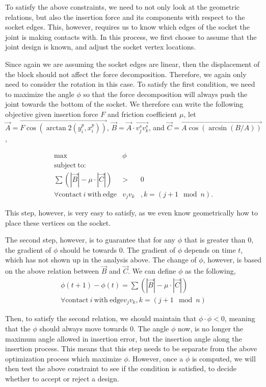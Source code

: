 To satisfy the above constraints, we need to not only look at the geometric relations, but also the insertion force and its components with respect to the socket edges. This, however, requires us to know which edges of the socket the joint is making contacts with. In this process, we first choose to assume that the joint design is known, and adjust the socket vertex locations. 

Since again we are assuming the socket edges are linear, then the displacement of the block should not affect the force decomposition. Therefore, we again only need to consider the rotation in this case. To satisfy the first condition, we need to maximize the angle $\phi$ so that the force decomposition will always push the joint towards the bottom of the socket. We therefore can write the following objective given insertion force $F$ and friction coefficient $\mu$, let $\overrightarrow{A} = \overrightarrow{F\cos(\arctan2(y^p_i, x^p_i))}$, $\overrightarrow{B} = \overrightarrow{A}\cdot\overrightarrow{v^s_jv^s_k}$, and $\overrightarrow{C} = \overrightarrow{A\cos(\arcsin(B/A))}$, 

\begin{eqnarray}
\max &\phi&\\
\mathrm{subject\ to: }&&\nonumber\\
\sum(|\overrightarrow{B}| - \mu\cdot |\overrightarrow{C}|) &>& 0\\
\forall\mathrm{contact\ } i\mathrm{\ with\ edge}& v_jv_k&, k=(j+1\mod n).\nonumber 
\end{eqnarray}

This step, however, is very easy to satisfy, as we even know geometrically how to place these vertices on the socket. 

The second step, however, is to guarantee that for any $\phi$ that is greater than $0$, the gradient of $\phi$ should be towards $0$. The gradient of $\phi$ depends on time $t$, which has not shown up in the analysis above. The change of $\phi$, however, is based on the above relation between $\overrightarrow{B}$ and $\overrightarrow{C}$. We can define $\phi$ as the following, 
\begin{eqnarray}
\phi(t+1) - \phi(t) = \sum(|\overrightarrow{B}| - \mu\cdot |\overrightarrow{C}|)\\
\forall\mathrm{contact\ } i\mathrm{\ with\ edge} v_jv_k, k=(j+1\mod n)\nonumber
\end{eqnarray}

Then, to satisfy the second relation, we should maintain that $\phi\cdot\dot{\phi} < 0$, meaning that the $\phi$ should always move towards $0$. The angle $\phi$ now, is no longer the maximum angle allowed in insertion error, but the insertion angle along the insertion process. This means that this step needs to be separate from the above optimization process which maximize $\phi$. However, once a $\phi$ is computed, we will then test the above constraint to see if the condition is satisfied, to decide whether to accept or reject a design. 

